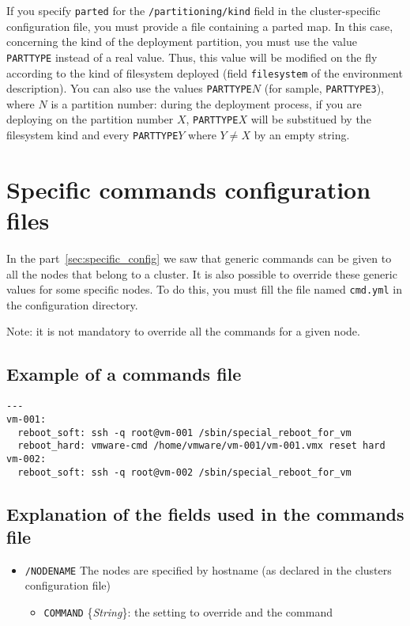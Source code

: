 \documentclass[a4wide,10pt,oneside]{book}
\newcommand{\ypath}[1]{\texttt{#1}}
\newcommand{\yfield}[2]{\texttt{#1} {\small\{{\emph{#2}}\}}:}
\begin{document}
If you specify \texttt{parted} for the \ypath{/partitioning/kind} field in the cluster-specific configuration file, you must provide a file containing a parted map. In this case, concerning the kind of the deployment partition, you must use the value \texttt{PARTTYPE} instead of a real value. Thus, this value will be modified on the fly according to the kind of filesystem deployed (field \texttt{filesystem} of the environment description). You can also use the values \texttt{PARTTYPE}$N$ (for sample, \texttt{PARTTYPE3}), where $N$ is a partition number: during the deployment process, if you are deploying on the partition number $X$, \texttt{PARTTYPE}$X$ will be substitued by the filesystem kind and every \texttt{PARTTYPE}$Y$ where $Y \neq X$ by an empty string.



\section{Specific commands configuration files}
In the part~\ref{sec:specific_config} we saw that generic commands can be given to all the nodes that belong to a cluster. It is also possible to override these generic values for some specific nodes. To do this, you must fill the file named \texttt{cmd.yml} in the configuration directory.

Note: it is not mandatory to override all the commands for a given node.

\subsection{Example of a commands file\\}
\begin{small}
\begin{verbatim}
---
vm-001:
  reboot_soft: ssh -q root@vm-001 /sbin/special_reboot_for_vm
  reboot_hard: vmware-cmd /home/vmware/vm-001/vm-001.vmx reset hard
vm-002:
  reboot_soft: ssh -q root@vm-002 /sbin/special_reboot_for_vm
\end{verbatim}
\end{small}

\subsection{Explanation of the fields used in the commands file\\}
\begin{itemize}
  \item \ypath{/NODENAME} The nodes are specified by hostname (as declared in the clusters configuration file)
  \begin{itemize}
    \item \yfield{COMMAND}{String} the setting to override and the command
  \end{itemize}
\end{itemize}
\end{document}
